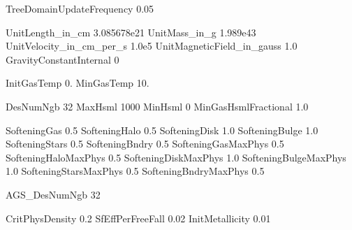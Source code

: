 TreeDomainUpdateFrequency   0.05        %

UnitLength_in_cm            3.085678e21     %
UnitMass_in_g               1.989e43  	    %
UnitVelocity_in_cm_per_s    1.0e5   	    %
UnitMagneticField_in_gauss  1.0   	        %
GravityConstantInternal     0		        %

InitGasTemp     0.	    %
MinGasTemp      10.	    %

DesNumNgb               32      %
MaxHsml                 1000  %
MinHsml                 0       %
MinGasHsmlFractional	1.0

SofteningGas    0.5    %
SofteningHalo   0.5 %
SofteningDisk   1.0   %
SofteningBulge  1.0  %
SofteningStars  0.5  %
SofteningBndry  0.5  %
SofteningGasMaxPhys     0.5    %
SofteningHaloMaxPhys    0.5
SofteningDiskMaxPhys    1.0
SofteningBulgeMaxPhys   1.0
SofteningStarsMaxPhys   0.5
SofteningBndryMaxPhys   0.5

AGS_DesNumNgb           32  %


CritPhysDensity     0.2    %
SfEffPerFreeFall    0.02   %
InitMetallicity     0.01 %

